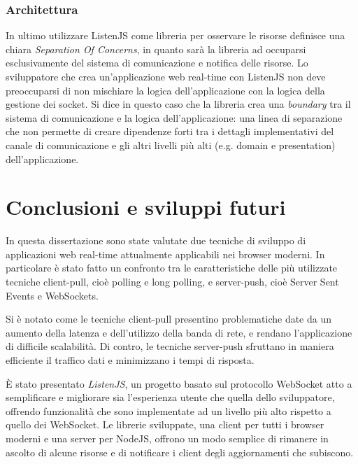 \documentclass[12pt,a4paper,openright,twoside]{report}
\begin{document}
\subsection{Architettura}
In ultimo utilizzare ListenJS come libreria per osservare le risorse definisce una chiara \textit{Separation Of Concerns}, in quanto sarà la libreria ad occuparsi esclusivamente del sistema di comunicazione e notifica delle risorse. Lo sviluppatore che crea un'applicazione web real-time con ListenJS non deve preoccuparsi di non mischiare la logica dell'applicazione con la logica della gestione dei socket. Si dice in questo caso che la libreria crea una \textit{boundary} tra il sistema di comunicazione e la logica dell'applicazione: una linea di separazione che non permette di creare dipendenze forti tra i dettagli implementativi del canale di comunicazione e gli altri livelli più alti (e.g. domain e presentation) dell'applicazione.

\clearpage{\pagestyle{empty}\cleardoublepage}
\chapter*{Conclusioni e sviluppi futuri}
In questa dissertazione sono state valutate due tecniche di sviluppo di applicazioni web real-time attualmente applicabili nei browser moderni. In particolare è stato fatto un confronto tra le caratteristiche delle più utilizzate tecniche client-pull, cioè polling e long polling, e server-push, cioè Server Sent Events e WebSockets.

Si è notato come le tecniche client-pull presentino problematiche date da un aumento della latenza e dell'utilizzo della banda di rete, e rendano l'applicazione di difficile scalabilità. Di contro, le tecniche server-push sfruttano in maniera efficiente il traffico dati e minimizzano i tempi di risposta.

\bigskip

È stato presentato \textit{ListenJS}, un progetto basato sul protocollo WebSocket atto a semplificare e migliorare sia l'esperienza utente che quella dello sviluppatore, offrendo funzionalità che sono implementate ad un livello più alto rispetto a quello dei WebSocket. Le librerie sviluppate, una client per tutti i browser moderni e una server per NodeJS, offrono un modo semplice di rimanere in ascolto di alcune risorse e di notificare i client degli aggiornamenti che subiscono.
\end{document}
